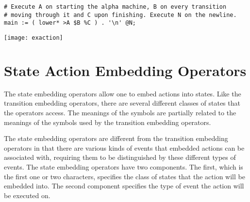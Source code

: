 \documentclass[letterpaper,11pt,oneside]{book}
\newcommand{\graphspace}{\vspace{10pt}}
\newenvironment{inline_code}{\def\baselinestretch{1}\vspace{12pt}\small}{}
\begin{document}
\begin{inline_code}
\begin{verbatim}
# Execute A on starting the alpha machine, B on every transition 
# moving through it and C upon finishing. Execute N on the newline.
main := ( lower* >A $B %C ) . '\n' @N;
\end{verbatim}
\end{inline_code}

\graphspace
\begin{center}
\texttt{[image: exaction]}
\end{center}
\graphspace


\section{State Action Embedding Operators}

The state embedding operators allow one to embed actions into states. Like the
transition embedding operators, there are several different classes of states
that the operators access. The meanings of the symbols are partially related to
the meanings of the symbols used by the transition embedding operators. 

The state embedding operators are different from the transition embedding
operators in that there are various kinds of events that embedded actions can
be associated with, requiring them to be distinguished by these different types
of events. The state embedding operators have two components.  The first, which
is the first one or two characters, specifies the class of states that the
action will be embedded into. The second component specifies the type of event
the action will be executed on. 

\def\fakeitem{\hspace*{12pt}$\bullet$\hspace*{10pt}}
\end{document}
